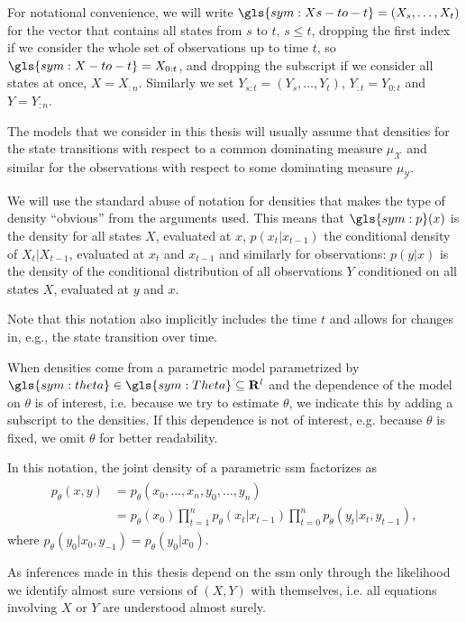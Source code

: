 For notational convenience, we will write $\gls{sym:Xs-to-t} = \left(X_s, \dots, X_{t}\right)$ for the vector that contains all states from $s$ to $t$, $s \leq t$, dropping the first index if we consider the whole set of observations up to time $t$, so $\gls{sym:X-to-t} = X_{0:t}$, and dropping the subscript if we consider all states at once, $X = X_{:n}$.
Similarly we set $Y_{s:t} = \left(Y_s, \dots, Y_{t}\right)$, $Y_{:t} = Y_{0:t}$ and $Y = Y_{:n}$.

The models that we consider in this thesis will usually assume that densities for the state transitions with respect to a common dominating measure $\mu_{\mathcal X}$ and similar for the observations with respect to some dominating measure $\mu_{\mathcal Y}$. 

\begin{notation}
    \label{not:densities}
    We will use the standard abuse of notation for densities that makes the type of density ``{}obvious''{} from the arguments used.
    This means that $\gls{sym:p}(x)$ is the density for all states $X$, evaluated at $x$, $p(x_t|x_{t - 1})$ the conditional density of $X_t|X_{t - 1}$, evaluated at $x_{t}$ and $x_{t - 1}$ and similarly for observations: $p(y|x)$ is the density of the conditional distribution of all observations $Y$ conditioned on all states $X$, evaluated at $y$ and $x$.

    Note that this notation also implicitly includes the time $t$ and allows for changes in, e.g., the state transition over time.

    When densities come from a parametric model parametrized by $\gls{sym:theta}\in \gls{sym:Theta} \subseteq \mathbf{R}^{l}$ and the dependence of the model on $\theta$ is of interest, i.e. because we try to estimate $\theta$, we indicate this by adding a subscript to the densities.
    If this dependence is not of interest, e.g. because $\theta$ is fixed, we omit $\theta$ for better readability.

    In this notation, the joint density of a parametric \gls{ssm} factorizes as
    \begin{align}
        \label{eq:joint_density}
        \begin{split}
        p_\theta(x,y) & = p_\theta(x_0, \dots, x_{n}, y_0, \dots, y_{n})                                                              \\
                      & = p_\theta (x_0)\prod_{t = 1}^{n} p_\theta(x_{t}|x_{t - 1}) \prod_{t = 0}^{n} p_\theta(y_t | x_t, y_{t - 1}),
        \end{split}
    \end{align}
    where $p_\theta(y_0|x_0, y_{-1}) = p_\theta(y_0| x_0)$.

    As inferences made in this thesis depend on the \gls{ssm} only through the likelihood we identify almost sure versions of $(X, Y)$ with themselves, i.e. all equations involving $X$ or $Y$ are understood almost surely.
\end{notation}

